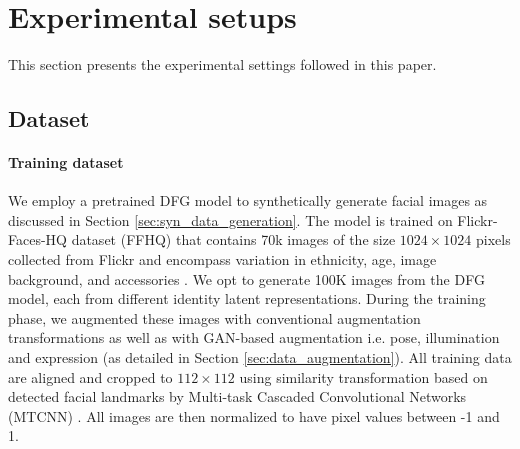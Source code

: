 \documentclass[10pt,twocolumn,letterpaper]{ieeeconf}
\begin{document}
\begin{table}[h!]
\caption{The effect of augmentation on identity in the images indicated by the verification performances as EER, FMR10, FMR100 and FMR1000 on three constructed datasets using GAN-based, RandAugment, and GAN-based with RandAugment augmentations. GAN-based with RandAugment augmentation results in bigger effects on identity, providing more challenging samples for the FR training.}
\label{tab:distribution_metrics}
\vspace{-4mm}
\end{table}

\section{Experimental setups}
This section presents the experimental settings followed in this paper.
\subsection{Dataset}
\vspace{-2mm}
\paragraph{Training dataset}
We employ a pretrained DFG model to synthetically generate facial images as discussed in Section \ref{sec:syn_data_generation}. The model is trained on Flickr-Faces-HQ dataset (FFHQ) \cite{StyleGAN} that contains 70k images of the size $1024 \times 1024$ pixels collected from Flickr and encompass variation in ethnicity, age, image background, and accessories \cite{StyleGAN}. We opt to generate 100K images from the DFG model, each from different identity latent representations. During the training phase, we augmented these images with conventional augmentation transformations as well as with GAN-based augmentation i.e. pose, illumination and expression (as detailed in Section \ref{sec:data_augmentation}). All training data are aligned and cropped to $112 \times 112$ using similarity transformation \cite{ArcFace,ElasticFace,CurricularFace} based on detected facial landmarks by Multi-task Cascaded Convolutional Networks (MTCNN) \cite{MTCNN}. All images are then normalized to have pixel values between -1 and 1.
\end{document}
